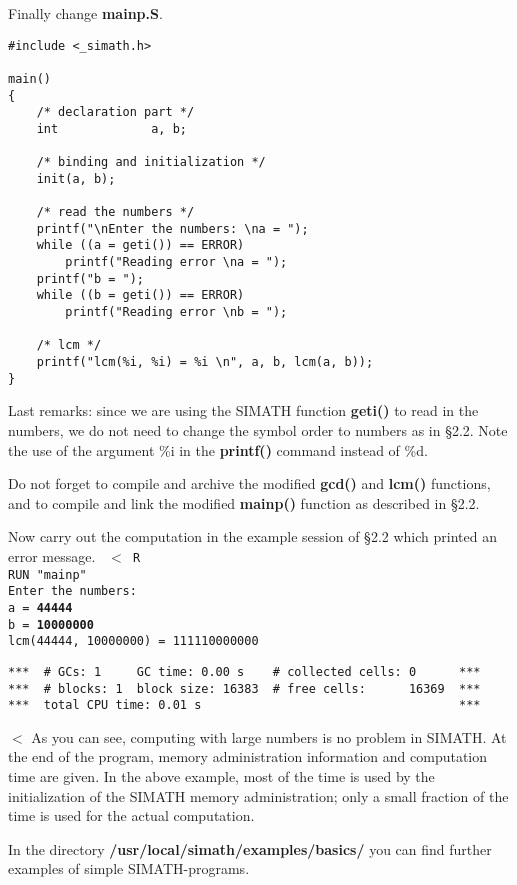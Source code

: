 \newpage
 
Finally change {\bf mainp.S}.
\begin{verbatim}
#include <_simath.h>

main()
{
    /* declaration part */
    int             a, b;

    /* binding and initialization */
    init(a, b);

    /* read the numbers */
    printf("\nEnter the numbers: \na = ");
    while ((a = geti()) == ERROR)
        printf("Reading error \na = ");
    printf("b = ");
    while ((b = geti()) == ERROR)
        printf("Reading error \nb = ");

    /* lcm */
    printf("lcm(%i, %i) = %i \n", a, b, lcm(a, b));
}
\end{verbatim} 
Last remarks: since we are using the SIMATH function {\bf geti()} to read in
the numbers, we do not need to change the symbol order to numbers as in
\S 2.2. Note the use of the argument \%i in the {\bf printf()} command instead
of \%d.

Do not forget to compile and archive the modified {\bf gcd()} and {\bf lcm()}
functions, and to compile and link the modified {\bf mainp()} function as 
described in \S 2.2.

Now carry out the computation in the example session of \S 2.2 which 
printed an error message.
\leer
{\tt
$<$ R \care \\
RUN "mainp"\\[1.0eM]
Enter the numbers:\\
a = {\bf 44444 \care}\\
b = {\bf 10000000 \care}\\
lcm(44444, 10000000) = 111110000000
}
\begin{verbatim}
***  # GCs: 1     GC time: 0.00 s    # collected cells: 0      ***    
***  # blocks: 1  block size: 16383  # free cells:      16369  ***    
***  total CPU time: 0.01 s                                    ***      
\end{verbatim}
$<$
\leer
As you can see, computing with large numbers is no problem in SIMATH.
At the end of the program, memory administration information and
computation time are given. In the above example, most of the time is used
by the initialization of the SIMATH memory administration; only a small fraction
of the time is used for the actual computation.

In the directory {\bf /usr/local/simath/examples/basics/} you can find further
examples of simple SIMATH-programs.


